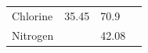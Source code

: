 \begin{enumerate}[noitemsep, label=\textbf{\arabic*}. ]
{\begin{tabular}[t]{|l|l|l|l|}
    
        Chlorine &
    
    
        35.45 &
    
    
        70.9 &
    
    
     \tabularnewline\cline{1-1}\cline{2-2}\cline{3-3}\cline{4-4}
    
    
        Nitrogen &
    
    
         &
    
    
        42.08 &
    
    
     \tabularnewline\cline{1-1}\cline{2-2}\cline{3-3}\cline{4-4}
    \end{tabular}} %
        \addtolength{\mytableboxheight}{\mytableboxdepth}
        \addtocounter{footnote}{-0}
        

\end{enumerate}
